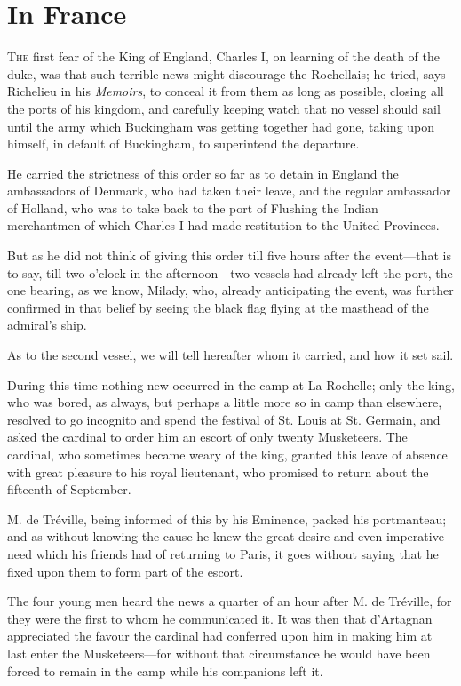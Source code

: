 
\chapter{In France}

\lettrine[]{T}{he} first fear of the King of England, Charles I, on learning of the death of the duke, was that such terrible news might discourage the Rochellais; he tried, says Richelieu in his \textit{Memoirs}, to conceal it from them as long as possible, closing all the ports of his kingdom, and carefully keeping watch that no vessel should sail until the army which Buckingham was getting together had gone, taking upon himself, in default of Buckingham, to superintend the departure. 

He carried the strictness of this order so far as to detain in England the ambassadors of Denmark, who had taken their leave, and the regular ambassador of Holland, who was to take back to the port of Flushing the Indian merchantmen of which Charles I had made restitution to the United Provinces. 

But as he did not think of giving this order till five hours after the event---that is to say, till two o'clock in the afternoon---two vessels had already left the port, the one bearing, as we know, Milady, who, already anticipating the event, was further confirmed in that belief by seeing the black flag flying at the masthead of the admiral's ship. 

As to the second vessel, we will tell hereafter whom it carried, and how it set sail. 

During this time nothing new occurred in the camp at La Rochelle; only the king, who was bored, as always, but perhaps a little more so in camp than elsewhere, resolved to go incognito and spend the festival of St. Louis at St. Germain, and asked the cardinal to order him an escort of only twenty Musketeers. The cardinal, who sometimes became weary of the king, granted this leave of absence with great pleasure to his royal lieutenant, who promised to return about the fifteenth of September. 

M. de Tréville, being informed of this by his Eminence, packed his portmanteau; and as without knowing the cause he knew the great desire and even imperative need which his friends had of returning to Paris, it goes without saying that he fixed upon them to form part of the escort. 

The four young men heard the news a quarter of an hour after M. de Tréville, for they were the first to whom he communicated it. It was then that d'Artagnan appreciated the favour the cardinal had conferred upon him in making him at last enter the Musketeers---for without that circumstance he would have been forced to remain in the camp while his companions left it. 

